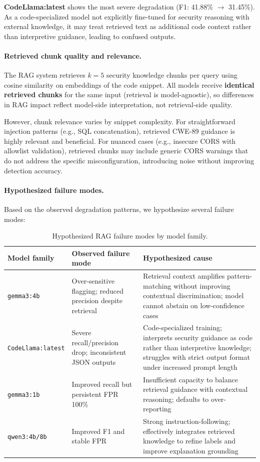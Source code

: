 \textbf{CodeLlama:latest} shows the most severe degradation (F1: 41.88\% $\rightarrow$ 31.45\%). As a code-specialized model not explicitly fine-tuned for security reasoning with external knowledge, it may treat retrieved text as additional code context rather than interpretive guidance, leading to confused outputs.

\paragraph{Retrieved chunk quality and relevance.}
The RAG system retrieves $k=5$ security knowledge chunks per query using cosine similarity on embeddings of the code snippet. All models receive \textbf{identical retrieved chunks} for the same input (retrieval is model-agnostic), so differences in RAG impact reflect model-side interpretation, not retrieval-side quality.

However, chunk relevance varies by snippet complexity. For straightforward injection patterns (e.g., SQL concatenation), retrieved CWE-89 guidance is highly relevant and beneficial. For nuanced cases (e.g., insecure CORS with allowlist validation), retrieved chunks may include generic CORS warnings that do not address the specific misconfiguration, introducing noise without improving detection accuracy.

\paragraph{Hypothesized failure modes.}
Based on the observed degradation patterns, we hypothesize several failure modes:

\begin{table}[H]
  \centering
  \caption{Hypothesized RAG failure modes by model family.}
  \label{tab:rag-failure-modes}
  \footnotesize
  \begin{tabularx}{\textwidth}{p{}Xp{}}
    \toprule
    Model family & Observed failure mode & Hypothesized cause \\
    \midrule
    \texttt{gemma3:4b} & Over-sensitive flagging; reduced precision despite retrieval & Retrieval context amplifies pattern-matching without improving contextual discrimination; model cannot abstain on low-confidence cases \\
    \texttt{CodeLlama:latest} & Severe recall/precision drop; inconsistent JSON outputs & Code-specialized training; interprets security guidance as code rather than interpretive knowledge; struggles with strict output format under increased prompt length \\
    \texttt{gemma3:1b} & Improved recall but persistent FPR 100\% & Insufficient capacity to balance retrieval guidance with contextual reasoning; defaults to over-reporting \\
    \texttt{qwen3:4b/8b} & Improved F1 and stable FPR & Strong instruction-following; effectively integrates retrieved knowledge to refine labels and improve explanation grounding \\
    \bottomrule
  \end{tabularx}
\end{table}

